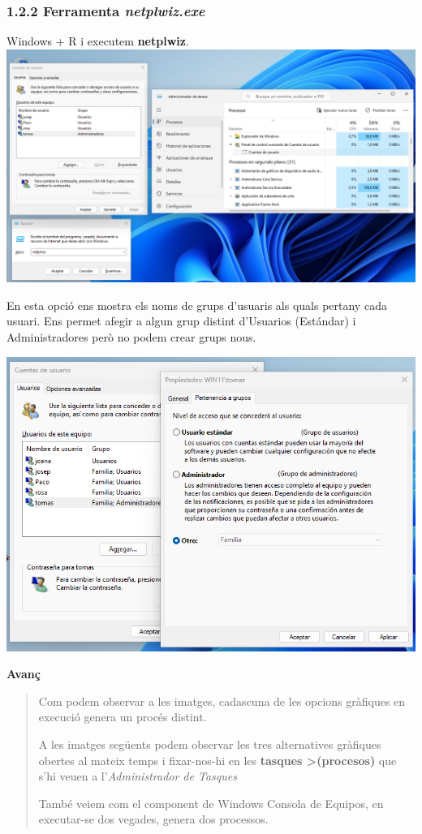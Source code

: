 \documentclass[
  a4paper,
]{article}
\begin{document}
\subsubsection{\texorpdfstring{1.2.2 Ferramenta
\emph{netplwiz.exe}}{1.2.2 Ferramenta netplwiz.exe}}\label{ferramenta-netplwiz.exe}

Windows + R i executem \textbf{netplwiz}.
\includegraphics{png/3netplwiz.png}

En esta opció ens mostra els noms de grups d'usuaris als quals pertany
cada usuari. Ens permet afegir a algun grup distint d'Usuarios
(Estándar) i Administradores però no podem crear grups nous.

\includegraphics{png/propiedadesNetplwiz.png}

\textbf{Avanç}

\begin{quote}
Com podem observar a les imatges, cadascuna de les opcions gràfiques en
execució genera un procés distint.

A les imatges següents podem observar les tres alternatives gràfiques
obertes al mateix temps i fixar-nos-hi en les \textbf{tasques
\textgreater(procesos)} que s'hi veuen a l'\emph{Administrador de
Tasques}

També veiem com el component de Windows Consola de Equipos, en
executar-se dos vegades, genera dos processos.
\end{quote}
\end{document}

